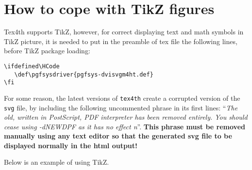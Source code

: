 \documentclass{article}
\def\pgfsysdriver{pgfsys-dvisvgm4ht.def}
\begin{document}
\section{How to cope with TikZ figures}\label{S3}
Tex4th supports TikZ, however, for correct displaying text and math symbols
in TikZ picture, it is needed to put in the preamble of tex file the
following lines, before TikZ package loading:
\begin{verbatim}
\ifdefined\HCode
   \def\pgfsysdriver{pgfsys-dvisvgm4ht.def}
\fi
\end{verbatim}

For some reason, the latest versions of \texttt{tex4th} create a corrupted
version of the \texttt{svg} file, by including the following uncommented
phrase in its first lines: ``\emph{The old, written in PostScript, PDF
interpreter has been removed entirely. You should cease using -dNEWDPF as it
has no effect n}''. \textbf{This phrase must be removed manually using any
text editor so that the generated svg file to be displayed normally in the
html output!}

Below is an example of using TikZ.
\end{document}
